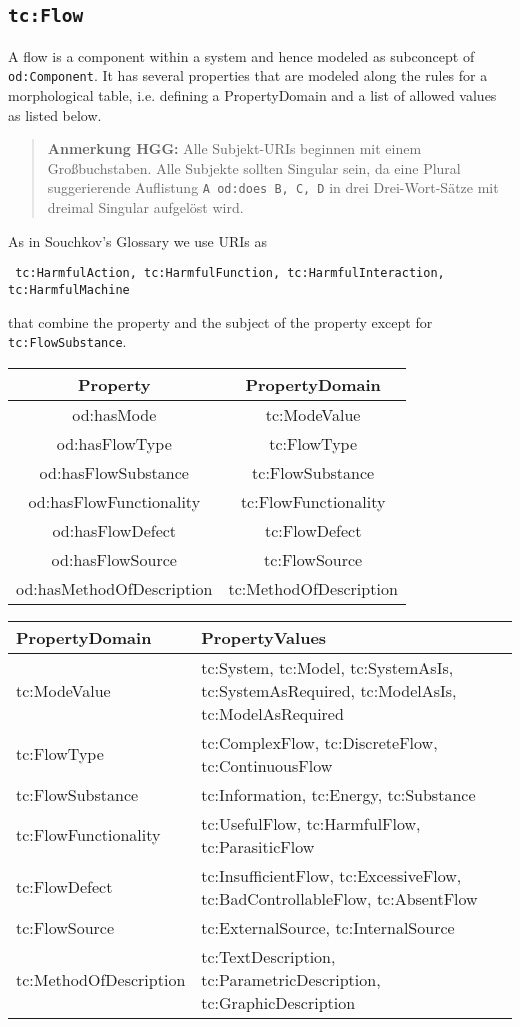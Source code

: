 \documentclass[11pt,a4paper]{article}
\newcommand{\HGG}[1]{\begin{quote}\textbf{Anmerkung HGG:} #1\end{quote}}
\begin{document}
\subsection{\texttt{tc:Flow}}

A flow is a component within a system and hence modeled as subconcept of
\texttt{od:Component}.  It has several properties that are modeled along the
rules for a morphological table, i.e. defining a PropertyDomain and a list of
allowed values as listed below.

\HGG{Alle Subjekt-URIs beginnen mit einem Großbuchstaben.  Alle Subjekte
  sollten Singular sein, da eine Plural suggerierende Auflistung \texttt{A
    od:does B, C, D} in drei Drei-Wort-Sätze mit dreimal Singular aufgelöst
  wird.}

As in Souchkov's Glossary we use URIs as 
\begin{center}\tt
  tc:HarmfulAction, tc:HarmfulFunction, tc:HarmfulInteraction,
  tc:HarmfulMachine
\end{center}
that combine the property and the subject of the property except for
\texttt{tc:FlowSubstance}.

\begin{center}
  \begin{tabular}{|c|c|}\hline
    Property & PropertyDomain \\\hline
    od:hasMode & tc:ModeValue \\
    od:hasFlowType & tc:FlowType  \\
    od:hasFlowSubstance & tc:FlowSubstance  \\
    od:hasFlowFunctionality & tc:FlowFunctionality  \\
    od:hasFlowDefect & tc:FlowDefect  \\
    od:hasFlowSource & tc:FlowSource  \\
    od:hasMethodOfDescription & tc:MethodOfDescription \\\hline 
  \end{tabular}
\end{center}

\begin{center}
  \begin{tabular}{|l|p{10cm}|}\hline
    PropertyDomain & PropertyValues \\\hline
    tc:ModeValue & tc:System, tc:Model, tc:SystemAsIs, tc:SystemAsRequired,
    tc:ModelAsIs, tc:ModelAsRequired \\
    tc:FlowType & tc:ComplexFlow, tc:DiscreteFlow, tc:ContinuousFlow \\
    tc:FlowSubstance & tc:Information, tc:Energy, tc:Substance \\
    tc:FlowFunctionality & tc:UsefulFlow, tc:HarmfulFlow, tc:ParasiticFlow  \\
    tc:FlowDefect & tc:InsufficientFlow, tc:ExcessiveFlow,
    tc:BadControllableFlow, tc:AbsentFlow \\ 
    tc:FlowSource & tc:ExternalSource, tc:InternalSource  \\
    tc:MethodOfDescription & tc:TextDescription, tc:ParametricDescription,
    tc:GraphicDescription \\\hline 
  \end{tabular}
\end{center}
\end{document}
